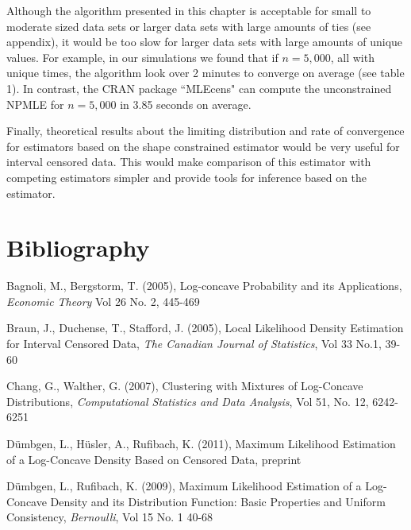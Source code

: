 \documentclass[10pt]{article}
\begin{document}
	Although the algorithm presented in this chapter is acceptable for small to moderate sized data sets or larger data sets with large amounts of ties (see appendix), it would be too slow for larger data sets with large amounts of unique values. For example, in our simulations we found that if $n = 5,000$, all with unique times, the algorithm look over 2 minutes to converge on average (see table 1). In contrast, the CRAN package ``MLEcens" can compute the unconstrained NPMLE for $ n = 5,000$ in 3.85 seconds on average. 
	
	Finally, theoretical results about the limiting distribution and rate of convergence for estimators based on the shape constrained estimator would be very useful for interval censored data. This would make comparison of this estimator with competing estimators simpler and provide tools for inference based on the estimator. 
			
	{\section{Bibliography} } 


Bagnoli, M., Bergstorm, T. (2005), Log-concave Probability and its Applications, \emph{Economic Theory} Vol 26 No. 2, 445-469

\vspace{3mm}

Braun, J., Duchense, T., Stafford, J. (2005), Local Likelihood Density Estimation for Interval Censored Data, \emph{The Canadian Journal of Statistics}, Vol 33 No.1, 39-60

\vspace{3mm}

Chang, G., Walther, G. (2007), Clustering with Mixtures of Log-Concave Distributions, \emph{Computational Statistics and Data Analysis}, Vol 51, No. 12, 6242-6251
	
\vspace{3mm}

D\"umbgen, L., H\"usler, A., Rufibach, K. (2011), Maximum Likelihood Estimation of a Log-Concave Density Based on Censored Data, preprint

\vspace{3mm}

D\"umbgen, L., Rufibach, K. (2009), Maximum Likelihood Estimation of a Log-Concave Density and its Distribution Function: Basic Properties and Uniform Consistency, \emph{Bernoulli}, Vol 15 No. 1 40-68

\vspace{3mm}
\end{document}
